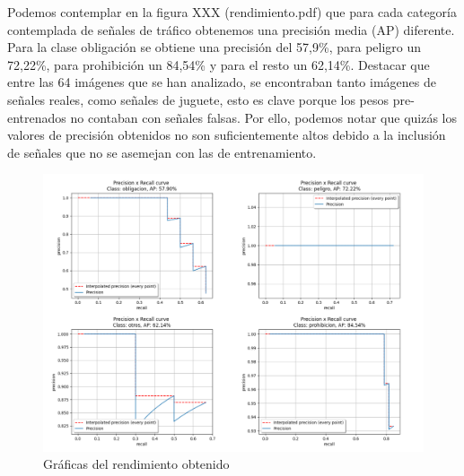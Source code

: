 Podemos contemplar en la figura XXX (rendimiento.pdf) que para cada categoría contemplada de señales de tráfico obtenemos una precisión media (AP) diferente. Para la clase obligación se obtiene una precisión del 57,9\%, para peligro un 72,22\%, para prohibición un 84,54\% y para el resto un 62,14\%. Destacar que entre las 64 imágenes que se han analizado, se encontraban tanto imágenes de señales reales, como señales de juguete, esto es clave porque los pesos pre-entrenados no contaban con señales falsas. Por ello, podemos notar que quizás los valores de precisión obtenidos no son suficientemente altos debido a la inclusión de señales que no se asemejan con las de entrenamiento.\\


\begin{figure}[H]
    \centering
 	\includegraphics[width=\textwidth]{Imagenes/IA/rendimiento.pdf}
    \caption{Gráficas del rendimiento obtenido}
    \label{rendimiento}
\end{figure}